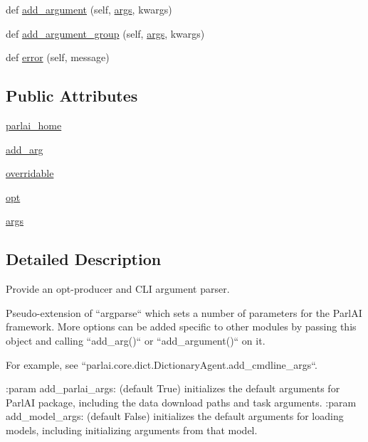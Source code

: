 \begin{DoxyCompactItemize}
\item 
def \hyperlink{classparlai_1_1core_1_1params_1_1ParlaiParser_a3ecf246ac5ed40769d313a2db962b43e}{add\+\_\+argument} (self, \hyperlink{classparlai_1_1core_1_1params_1_1ParlaiParser_a27d35bfa073588bf887cbdbf45c19f39}{args}, kwargs)
\item 
def \hyperlink{classparlai_1_1core_1_1params_1_1ParlaiParser_a2855a5676bf638bfc9491577e603eee3}{add\+\_\+argument\+\_\+group} (self, \hyperlink{classparlai_1_1core_1_1params_1_1ParlaiParser_a27d35bfa073588bf887cbdbf45c19f39}{args}, kwargs)
\item 
def \hyperlink{classparlai_1_1core_1_1params_1_1ParlaiParser_a8d0cb15ecc35f82c94b5a19c2a6a9d12}{error} (self, message)
\end{DoxyCompactItemize}
\subsection*{Public Attributes}
\begin{DoxyCompactItemize}
\item 
\hyperlink{classparlai_1_1core_1_1params_1_1ParlaiParser_a5ec04b6d66c84a0418930aac367bcc35}{parlai\+\_\+home}
\item 
\hyperlink{classparlai_1_1core_1_1params_1_1ParlaiParser_a7049960456af2af847ac8721d93cda0a}{add\+\_\+arg}
\item 
\hyperlink{classparlai_1_1core_1_1params_1_1ParlaiParser_a553d6c6c3576b217b0602befa0325e6a}{overridable}
\item 
\hyperlink{classparlai_1_1core_1_1params_1_1ParlaiParser_aa7c461e146b468d033fea1d1dcd92bcf}{opt}
\item 
\hyperlink{classparlai_1_1core_1_1params_1_1ParlaiParser_a27d35bfa073588bf887cbdbf45c19f39}{args}
\end{DoxyCompactItemize}


\subsection{Detailed Description}
\begin{DoxyVerb}Provide an opt-producer and CLI argument parser.

Pseudo-extension of ``argparse`` which sets a number of parameters
for the ParlAI framework. More options can be added specific to other
modules by passing this object and calling ``add_arg()`` or
``add_argument()`` on it.

For example, see ``parlai.core.dict.DictionaryAgent.add_cmdline_args``.

:param add_parlai_args:
    (default True) initializes the default arguments for ParlAI
    package, including the data download paths and task arguments.
:param add_model_args:
    (default False) initializes the default arguments for loading
    models, including initializing arguments from that model.
\end{DoxyVerb}
 

